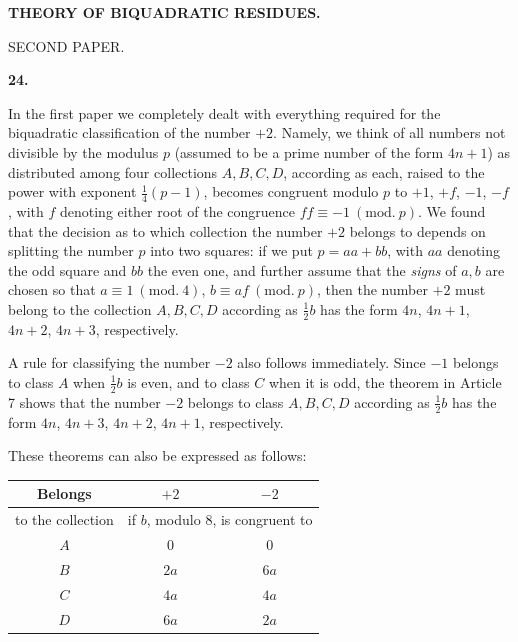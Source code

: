 \clearpage
{}%

\renewcommand{\BookRunningTitle}{Theory of Biquadratic Residues}
\renewcommand{\Article}[1]{\par\medskip\Needspace{4\baselineskip}\pdfbookmark[1]{Article #1}{paper-five-art-#1}\centerline{\textbf{#1.}}\nobreak\smallskip}
\begin{center}
\textbf{THEORY OF BIQUADRATIC RESIDUES.}\par
\bigskip SECOND PAPER.
\end{center}
\Article{24}
In the first paper we completely dealt with everything required for the biquadratic classification of the number $+2$. Namely, we think of all numbers not divisible by the modulus $p$ (assumed to be a prime number of the form $4n+1$) as distributed among four collections $A,B,C,D$, according as each, raised to the power with exponent $\frac14(p-1)$, becomes congruent modulo $p$ to $+1$, $+f$, $-1$, $-f$, with $f$ denoting either root of the congruence $ff\equiv-1\ (\mathrm{mod.}\ p)$. We found that the decision as to which collection the number $+2$ belongs to depends on splitting the number $p$ into two squares: if we put $p=aa+bb$, with $aa$ denoting the odd square and $bb$ the even one, and further assume that the \emph{signs} of $a,b$ are chosen so that $a\equiv1\ (\mathrm{mod.}\ 4)$, $b\equiv af\ (\mathrm{mod.}\ p)$, then the number $+2$ must belong to the collection $A,B,C,D$ according as $\frac12b$ has the form $4n$, $4n+1$, $4n+2$, $4n+3$, respectively.

A rule for classifying the number $-2$ also follows immediately. Since $-1$ belongs to class $A$ when $\frac12b$ is even, and to class $C$ when it is odd, the theorem in Article 7 shows that the number $-2$ belongs to class $A,B,C,D$ according as $\frac12b$ has the form $4n$, $4n+3$, $4n+2$, $4n+1$, respectively.

These theorems can also be expressed as follows:

%
\begin{center}
\begin{tabular}{c|c|c}
Belongs&$+2$&$-2$\\\hline
to the collection&\multicolumn{2}{c}{if $b$, modulo $8$, is congruent to}\\\hline
$A$&$0$&$0$\\
$B$&$2a$&$6a$\\
$C$&$4a$&$4a$\\
$D$&$6a$&$2a$
\end{tabular}
\end{center}

